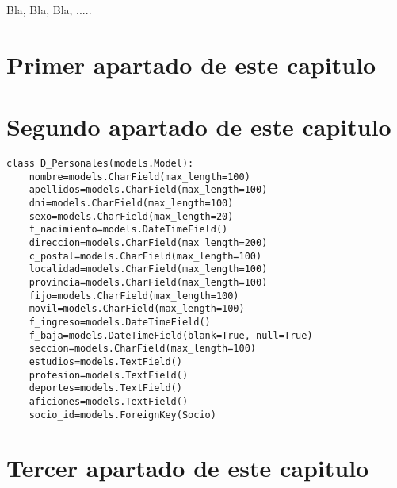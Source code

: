 


Bla, Bla, Bla, .....

\section{Primer apartado de este capitulo}
\label{3:sec1}






\section{Segundo apartado de este capitulo}
\label{3:sec2}


\begin{lstlisting}[caption={Ejemplo de listado puesto aquí}]
class D_Personales(models.Model):
    nombre=models.CharField(max_length=100)
    apellidos=models.CharField(max_length=100)
    dni=models.CharField(max_length=100)
    sexo=models.CharField(max_length=20)
    f_nacimiento=models.DateTimeField()
    direccion=models.CharField(max_length=200)
    c_postal=models.CharField(max_length=100)
    localidad=models.CharField(max_length=100)
    provincia=models.CharField(max_length=100)
    fijo=models.CharField(max_length=100)
    movil=models.CharField(max_length=100)
    f_ingreso=models.DateTimeField()
    f_baja=models.DateTimeField(blank=True, null=True)
    seccion=models.CharField(max_length=100)
    estudios=models.TextField()
    profesion=models.TextField()
    deportes=models.TextField()
    aficiones=models.TextField()
    socio_id=models.ForeignKey(Socio)
\end{lstlisting}

\section{Tercer apartado de este capitulo}
\label{3:sec3}
